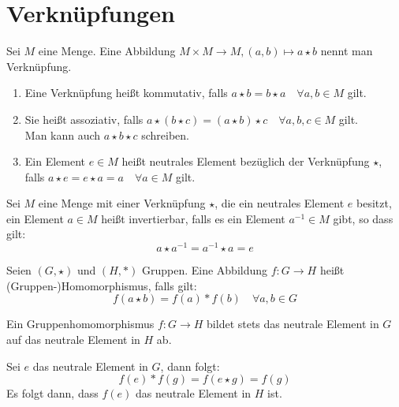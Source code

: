 \chapter{Verknüpfungen}
Sei $M$ eine Menge. Eine Abbildung $M\times M \rightarrow M, (a,b)\mapsto a\star b$ nennt man Verknüpfung.

\begin{enumerate}
  \item Eine Verknüpfung heißt kommutativ, falls $a\star b = b\star a \quad\forall a,b\in M$ gilt.
  \item Sie heißt assoziativ, falls $a\star(b\star c)=(a\star b)\star c \quad\forall a,b,c\in M$ gilt.\\
  Man kann auch $a\star b\star c$ schreiben.
  \item Ein Element $e\in M$ heißt neutrales Element bezüglich der Verknüpfung $\star$,\\
  falls $a\star e = e\star a=a \quad\forall a\in M$ gilt.
\end{enumerate}

Sei $M$ eine Menge mit einer Verknüpfung $\star$, die ein neutrales Element $e$ besitzt, ein Element $a\in M$ heißt invertierbar, falls es ein Element $a^{-1}\in M$ gibt, so dass gilt:
\begin{equation*}
  a\star a^{-1} = a^{-1} \star a = e
\end{equation*}


Seien $(G,\star)$ und $(H,\ast)$ Gruppen. Eine Abbildung $f:G\rightarrow H$ heißt (Gruppen-)Homomorphismus, falls gilt:
\begin{equation*}
  f(a\star b)=f(a)\ast f(b)\quad\forall a,b\in G
\end{equation*}
\begin{lemma}{}
  Ein Gruppenhomomorphismus $f:G\rightarrow H$ bildet stets das neutrale Element in $G$ auf das neutrale Element in $H$ ab.
\end{lemma}
\beweis
Sei $e$ das neutrale Element in $G$, dann folgt:
\begin{equation*}
  f(e)\ast f(g)=f(e\star g)=f(g)
\end{equation*}
Es folgt dann, dass $f(e)$ das neutrale Element in $H$ ist.

